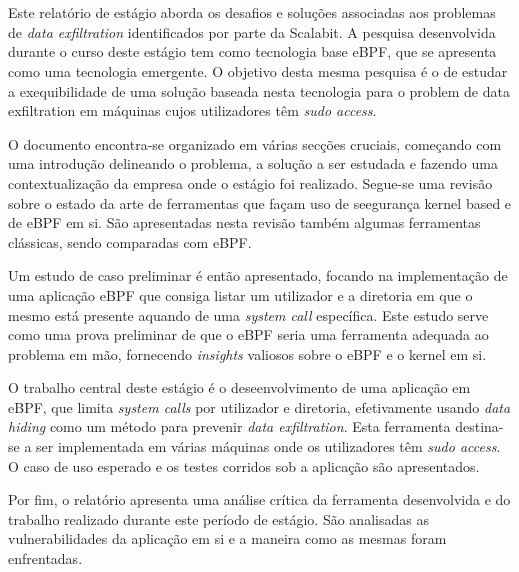 \documentclass[11pt,twoside]{estiloUBI}
\begin{document}


\newpage
\section*{}
\vspace{0.5cm}
Este relatório de estágio aborda os desafios e soluções associadas aos problemas de \textit{data exfiltration} identificados por parte da Scalabit.
A pesquisa desenvolvida durante o curso deste estágio tem como tecnologia base eBPF, que se apresenta como uma tecnologia emergente. O objetivo desta mesma pesquisa é o de estudar a exequibilidade de uma solução baseada nesta tecnologia para o problem de data exfiltration em máquinas cujos utilizadores têm \textit{sudo access}.

O documento encontra-se organizado em várias secções cruciais, começando com uma introdução delineando o problema, a solução a ser estudada e fazendo uma contextualização da empresa onde o estágio foi realizado. Segue-se uma revisão sobre o estado da arte de ferramentas que façam uso de seegurança kernel based e de eBPF em si. São apresentadas nesta revisão também algumas ferramentas clássicas, sendo comparadas com eBPF.

Um estudo de caso preliminar é então apresentado, focando na implementação de uma aplicação eBPF que consiga listar um utilizador e a diretoria em que o mesmo está presente aquando de uma \textit{system call} específica. Este estudo serve como uma prova preliminar de que o eBPF seria uma ferramenta adequada ao problema em mão, fornecendo \textit{insights} valiosos sobre o eBPF e o kernel em si.

O trabalho central deste estágio é o deseenvolvimento de uma aplicação em eBPF, que limita \textit{system calls} por utilizador e diretoria, efetivamente usando \textit{data hiding} como um método para prevenir \textit{data exfiltration}. Esta ferramenta destina-se a ser implementada em várias máquinas onde os utilizadores têm \textit{sudo access}. O caso de uso esperado e os testes corridos sob a aplicação são apresentados.

Por fim, o relatório apresenta uma análise crítica da ferramenta desenvolvida e do trabalho realizado durante este período de estágio. São analisadas as vulnerabilidades da aplicação em si e a maneira como as mesmas foram enfrentadas.
\end{document}
